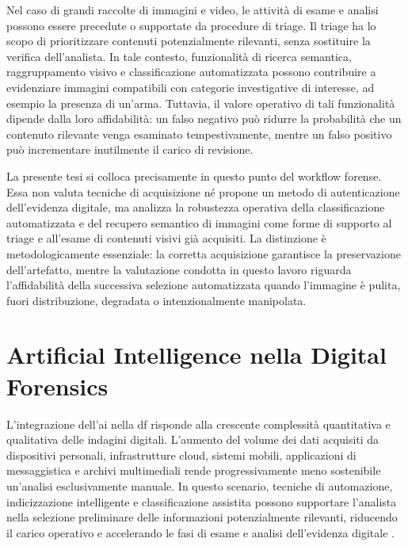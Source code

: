 Nel caso di grandi raccolte di immagini e video, le attività di esame e analisi possono essere precedute o supportate da procedure di triage. Il triage ha lo scopo di prioritizzare contenuti potenzialmente rilevanti, senza sostituire la verifica dell'analista. In tale contesto, funzionalità di ricerca semantica, raggruppamento visivo e classificazione automatizzata possono contribuire a evidenziare immagini compatibili con categorie investigative di interesse, ad esempio la presenza di un'arma. Tuttavia, il valore operativo di tali funzionalità dipende dalla loro affidabilità: un falso negativo può ridurre la probabilità che un contenuto rilevante venga esaminato tempestivamente, mentre un falso positivo può incrementare inutilmente il carico di revisione.

La presente tesi si colloca precisamente in questo punto del workflow forense. Essa non valuta tecniche di acquisizione né propone un metodo di autenticazione dell'evidenza digitale, ma analizza la robustezza operativa della classificazione automatizzata e del recupero semantico di immagini come forme di supporto al triage e all'esame di contenuti visivi già acquisiti. La distinzione è metodologicamente essenziale: la corretta acquisizione garantisce la preservazione dell'artefatto, mentre la valutazione condotta in questo lavoro riguarda l'affidabilità della successiva selezione automatizzata quando l'immagine è pulita, fuori distribuzione, degradata o intenzionalmente manipolata.



\section{Artificial Intelligence nella Digital Forensics}
\label{sec:background_ai_digital_forensics}
L'integrazione dell'\gls{ai} nella \gls{df} risponde alla crescente complessità quantitativa e qualitativa delle indagini digitali. L'aumento del volume dei dati acquisiti da dispositivi personali, infrastrutture cloud, sistemi mobili, applicazioni di messaggistica e archivi multimediali rende progressivamente meno sostenibile un'analisi esclusivamente manuale. In questo scenario, tecniche di automazione, indicizzazione intelligente e classificazione assistita possono supportare l'analista nella selezione preliminare delle informazioni potenzialmente rilevanti, riducendo il carico operativo e accelerando le fasi di esame e analisi dell'evidenza digitale \cite{garfinkel2010digital,costantini2019digital}.

